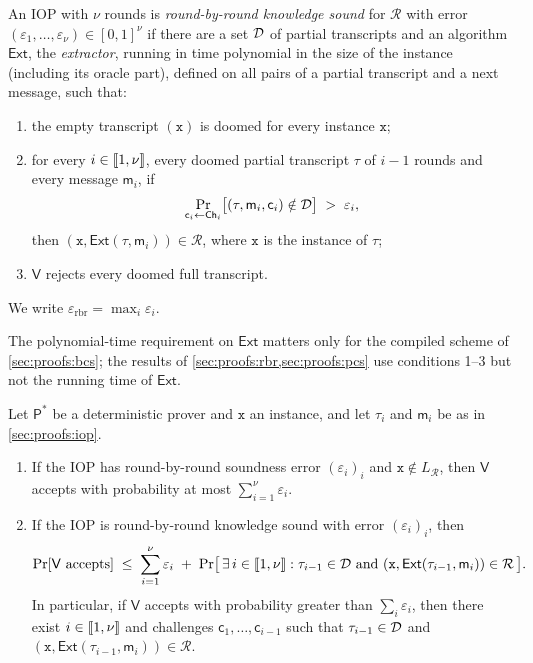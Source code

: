 \begin{definition}\label{def:rbr-knowledge}
An IOP with $\nu$ rounds is \emph{round-by-round knowledge sound} for $\mathcal{R}$ with error $(\varepsilon_1,\dots,\varepsilon_\nu) \in [0,1]^\nu$ if there are a set $\mathcal{D}$ of partial transcripts and an algorithm $\mathsf{Ext}$, the \emph{extractor}, running in time polynomial in the size of the instance (including its oracle part), defined on all pairs of a partial transcript and a next message, such that:
\begin{enumerate}
  \item the empty transcript $(\mathtt{x})$ is doomed for every instance $\mathtt{x}$;
  \item for every $i \in \llbracket 1, \nu \rrbracket$, every doomed partial transcript $\tau$ of $i-1$ rounds and every message $\mathsf{m}_i$, if
  \[
    \Pr_{\mathsf{c}_i \leftarrow \mathsf{Ch}_i}\bigl[(\tau, \mathsf{m}_i, \mathsf{c}_i) \notin \mathcal{D}\bigr] \;>\; \varepsilon_i ,
  \]
  then $(\mathtt{x}, \mathsf{Ext}(\tau, \mathsf{m}_i)) \in \mathcal{R}$, where $\mathtt{x}$ is the instance of $\tau$;
  \item $\mathsf{V}$ rejects every doomed full transcript.
\end{enumerate}
We write $\varepsilon_{\mathrm{rbr}} = \max_i \varepsilon_i$.
\end{definition}

The polynomial-time requirement on $\mathsf{Ext}$ matters only for the compiled scheme of \cref{sec:proofs:bcs}; the results of \cref{sec:proofs:rbr,sec:proofs:pcs} use conditions 1--3 but not the running time of $\mathsf{Ext}$.

\begin{lemma}\label{lem:rbr-overall}
Let $\mathsf{P}^*$ be a deterministic prover and $\mathtt{x}$ an instance, and let $\tau_i$ and $\mathsf{m}_i$ be as in \cref{sec:proofs:iop}.
\begin{enumerate}
  \item If the IOP has round-by-round soundness error $(\varepsilon_i)_i$ and $\mathtt{x} \notin L_{\mathcal{R}}$, then $\mathsf{V}$ accepts with probability at most $\sum_{i=1}^{\nu} \varepsilon_i$.
  \item If the IOP is round-by-round knowledge sound with error $(\varepsilon_i)_i$, then
  \[
    \Pr[\mathsf{V} \text{ accepts}] \;\le\; \sum_{i=1}^{\nu} \varepsilon_i \;+\; \Pr\bigl[\, \exists\, i \in \llbracket 1, \nu \rrbracket : \tau_{i-1} \in \mathcal{D} \text{ and } (\mathtt{x}, \mathsf{Ext}(\tau_{i-1}, \mathsf{m}_i)) \in \mathcal{R} \,\bigr].
  \]
  In particular, if $\mathsf{V}$ accepts with probability greater than $\sum_i \varepsilon_i$, then there exist $i \in \llbracket 1, \nu \rrbracket$ and challenges $\mathsf{c}_1,\dots,\mathsf{c}_{i-1}$ such that $\tau_{i-1} \in \mathcal{D}$ and $(\mathtt{x}, \mathsf{Ext}(\tau_{i-1}, \mathsf{m}_i)) \in \mathcal{R}$.
\end{enumerate}
\end{lemma}

